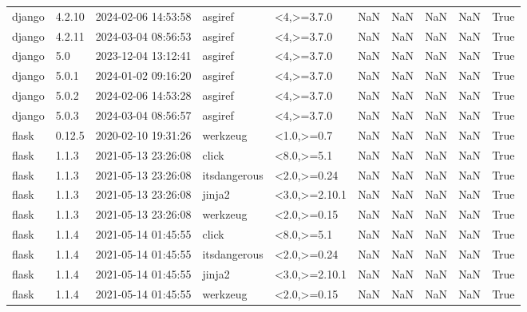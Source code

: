 \begin{tabular}{lllllrrrrr}
django & 4.2.10 & 2024-02-06 14:53:58 & asgiref & <4,>=3.7.0 & NaN & NaN & NaN & NaN & True \\
django & 4.2.11 & 2024-03-04 08:56:53 & asgiref & <4,>=3.7.0 & NaN & NaN & NaN & NaN & True \\
django & 5.0 & 2023-12-04 13:12:41 & asgiref & <4,>=3.7.0 & NaN & NaN & NaN & NaN & True \\
django & 5.0.1 & 2024-01-02 09:16:20 & asgiref & <4,>=3.7.0 & NaN & NaN & NaN & NaN & True \\
django & 5.0.2 & 2024-02-06 14:53:28 & asgiref & <4,>=3.7.0 & NaN & NaN & NaN & NaN & True \\
django & 5.0.3 & 2024-03-04 08:56:57 & asgiref & <4,>=3.7.0 & NaN & NaN & NaN & NaN & True \\
flask & 0.12.5 & 2020-02-10 19:31:26 & werkzeug & <1.0,>=0.7 & NaN & NaN & NaN & NaN & True \\
flask & 1.1.3 & 2021-05-13 23:26:08 & click & <8.0,>=5.1 & NaN & NaN & NaN & NaN & True \\
flask & 1.1.3 & 2021-05-13 23:26:08 & itsdangerous & <2.0,>=0.24 & NaN & NaN & NaN & NaN & True \\
flask & 1.1.3 & 2021-05-13 23:26:08 & jinja2 & <3.0,>=2.10.1 & NaN & NaN & NaN & NaN & True \\
flask & 1.1.3 & 2021-05-13 23:26:08 & werkzeug & <2.0,>=0.15 & NaN & NaN & NaN & NaN & True \\
flask & 1.1.4 & 2021-05-14 01:45:55 & click & <8.0,>=5.1 & NaN & NaN & NaN & NaN & True \\
flask & 1.1.4 & 2021-05-14 01:45:55 & itsdangerous & <2.0,>=0.24 & NaN & NaN & NaN & NaN & True \\
flask & 1.1.4 & 2021-05-14 01:45:55 & jinja2 & <3.0,>=2.10.1 & NaN & NaN & NaN & NaN & True \\
flask & 1.1.4 & 2021-05-14 01:45:55 & werkzeug & <2.0,>=0.15 & NaN & NaN & NaN & NaN & True \\
\bottomrule
\end{tabular}
